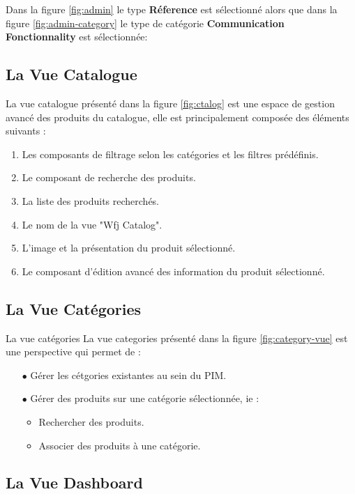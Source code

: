 Dans la figure \ref{fig:admin} le type \textbf{Réference} est sélectionné alors que dans la figure \ref{fig:admin-category} le type de catégorie \textbf{Communication Fonctionnality} est sélectionnée: 




\subsection{La Vue Catalogue}

La vue catalogue présenté dans la figure \ref{fig:ctalog} est une espace de gestion avancé des produits du catalogue, elle est principalement composée des éléments suivants :

\begin{enumerate}
    \item Les composants de filtrage selon les catégories et les filtres prédéfinis.
    \item Le composant de recherche des produits.
    \item La liste des produits recherchés.
    \item Le nom de la vue "Wfj Catalog".
    \item L'image et la présentation du produit sélectionné.
    \item Le composant d'édition avancé des information du produit sélectionné.
\end{enumerate}


\subsection{La Vue Catégories}

La vue catégories La vue categories présenté dans la figure \ref{fig:category-vue} est une perspective qui permet de : 

\begin{itemize}
    \item[$\bullet$] Gérer les cétgories existantes au sein du PIM.
    \medskip
    \item[$\bullet$] Gérer des produits sur une catégorie sélectionnée, ie :
    \begin{itemize}
    \smallskip
        \item Rechercher des produits.
        \smallskip
        \item Associer des produits à une catégorie.
    \end{itemize}
\end{itemize}


\subsection{La Vue Dashboard}

